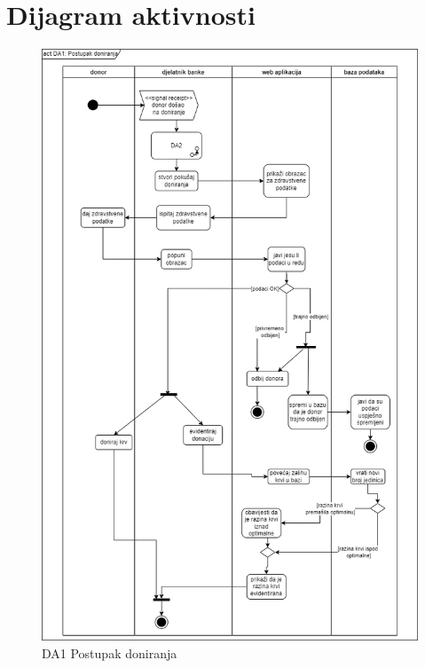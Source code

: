 			
			

\section{Dijagram aktivnosti}

    \begin{figure}[H]
        \includegraphics[scale=0.40]{slike/DA1 Postupak doniranja.png}
    	\centering
    	\caption{DA1 Postupak doniranja}
    	\label{fig:da1}
    \end{figure}
        

